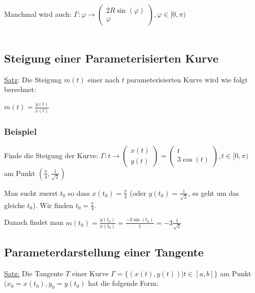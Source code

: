 \documentclass[11pt]{article} %
\begin{document}
Manchmal wird auch: $\Gamma: \varphi \rightarrow  \left(\!
    \begin{array}{c}
     2R\sin(\varphi)   \\
     \varphi 
    \end{array}
  \!\right), \varphi \in [0, \pi)$\\\\

\subsection{Steigung einer Parameterisierten Kurve}


\underline{Satz}: Die Steigung $m(t)$ einer nach $t$ parameterisierten Kurve wird wie folgt berechnet:

\begin{center}
$m(t) = \frac{\dot y(t)}{\dot x(t)}$
\end{center}

\subsubsection{Beispiel}

Finde die Steigung der Kurve:
$\Gamma: t \rightarrow  \left(\!
    \begin{array}{c}
     x(t)   \\
     y(t) 
    \end{array}
  \!\right) = \left(\!
    \begin{array}{c}
     t   \\
     3\cos(t) 
    \end{array}
  \!\right), t \in [0, \pi)$\\ am Punkt $(\frac{\pi}{4},\frac{1}{\sqrt{2}})$

Man sucht zuerst $t_0$ so dass $x(t_0)=\frac{\pi}{4}$ (oder $y(t_0) = \frac{1}{\sqrt{2}}$, es geht um das gleiche $t_0$). Wir finden $t_0 = \frac{\pi}{4}$. 

Danach findet man $m(t_0) = \frac{\dot y(t_0)}{\dot x(t_0)}=\frac{-3\sin(t_0)}{1} = -3\frac{1}{\sqrt{2}}$

\subsection{Parameterdarstellung einer Tangente}

\underline{Satz:} Die Tangente $T$ einer Kurve $\Gamma = \{(x(t),y(t)) |t \in [a,b] \}$ am Punkt $(x_0 = x(t_0),y_0 = y(t_0)$ hat die folgende Form:
\end{document}
